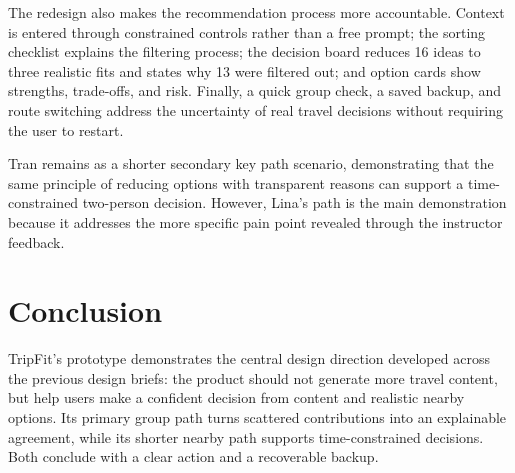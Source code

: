 \documentclass[11pt,a4paper]{article}
\begin{document}
The redesign also makes the recommendation process more accountable. Context is entered through constrained controls rather than a free prompt; the sorting checklist explains the filtering process; the decision board reduces 16 ideas to three realistic fits and states why 13 were filtered out; and option cards show strengths, trade-offs, and risk. Finally, a quick group check, a saved backup, and route switching address the uncertainty of real travel decisions without requiring the user to restart.

Tran remains as a shorter secondary key path scenario, demonstrating that the same principle of reducing options with transparent reasons can support a time-constrained two-person decision. However, Lina's path is the main demonstration because it addresses the more specific pain point revealed through the instructor feedback.

\section{Conclusion}

TripFit's prototype demonstrates the central design direction developed across the previous design briefs: the product should not generate more travel content, but help users make a confident decision from content and realistic nearby options. Its primary group path turns scattered contributions into an explainable agreement, while its shorter nearby path supports time-constrained decisions. Both conclude with a clear action and a recoverable backup.
\end{document}
